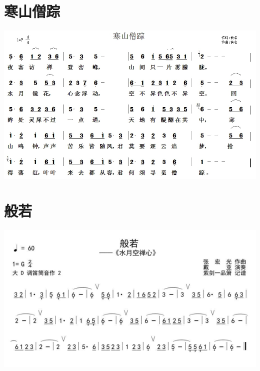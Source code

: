 \documentclass[cn,pad,twocol]{elegantbook}
\begin{document}
\section{寒山僧踪}              \includegraphics[width=\textwidth]{dongxiao/20200710-寒山僧踪.jpg}
\section{般若}                  \includegraphics[width=\textwidth]{macos/20210205般若.png}
\end{document}
